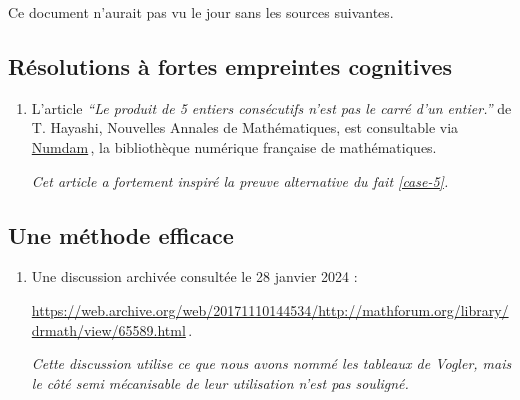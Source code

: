 	



Ce document n'aurait pas vu le jour sans les sources suivantes.




\subsection{Résolutions à fortes empreintes cognitives}

\leavevmode
\smallskip

\begin{enumerate}
	\item L'article \emph{\enquote{Le produit de 5 entiers consécutifs n'est pas le carré d'un entier.}} de T. Hayashi, Nouvelles Annales de Mathématiques, est consultable via \href{https://numdam.org}{Numdam}\,, la bibliothèque numérique française de mathématiques.
	
	\smallskip
	\noindent
	\emph{Cet article a fortement inspiré la preuve alternative du fait \ref{case-5}.}
\end{enumerate}




\subsection{Une méthode efficace}

\leavevmode
\smallskip

\begin{enumerate}
	\item Une discussion archivée consultée le 28 janvier 2024 : 
	
	\noindent
	\url{https://web.archive.org/web/20171110144534/http://mathforum.org/library/drmath/view/65589.html}\,.
	
	\smallskip
	\noindent
	\emph{Cette discussion utilise ce que nous avons nommé les tableaux de Vogler, mais le côté semi mécanisable de leur utilisation n'est pas souligné.}
\end{enumerate}